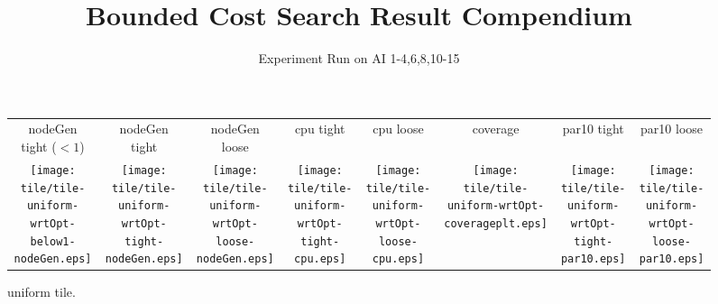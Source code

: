 \documentclass[a4paper,landscape]{article}
\title{Bounded Cost Search Result Compendium}
\author{Experiment Run on AI 1-4,6,8,10-15}
\begin{document}
\maketitle
\newcommand{\cpufigureplotwidth}{0.1\textwidth}
\begin{figure}[t]
	\centering
	\begin{tabular}{c c c c c c c c}
        nodeGen tight ($<1$) & nodeGen tight & nodeGen loose & cpu
        tight & cpu loose & coverage & par10 tight & par10 loose\\
	   \begin{minipage}{\cpufigureplotwidth}
       \texttt{[image: tile/tile-uniform-wrtOpt-below1-nodeGen.eps]}
        \end{minipage}&
        \begin{minipage}{\cpufigureplotwidth}
        \texttt{[image: tile/tile-uniform-wrtOpt-tight-nodeGen.eps]}
        \end{minipage}&
        \begin{minipage}{\cpufigureplotwidth}
       \texttt{[image: tile/tile-uniform-wrtOpt-loose-nodeGen.eps]}
        \end{minipage}&
        \begin{minipage}{\cpufigureplotwidth}
        \texttt{[image: tile/tile-uniform-wrtOpt-tight-cpu.eps]}
        \end{minipage}&
        \begin{minipage}{\cpufigureplotwidth}
        \texttt{[image: tile/tile-uniform-wrtOpt-loose-cpu.eps]}
        \end{minipage}&
        \begin{minipage}{\cpufigureplotwidth}
        \texttt{[image: tile/tile-uniform-wrtOpt-coverageplt.eps]}
        \end{minipage}&
        \begin{minipage}{\cpufigureplotwidth}
        \texttt{[image: tile/tile-uniform-wrtOpt-tight-par10.eps]}
        \end{minipage}&
        \begin{minipage}{\cpufigureplotwidth}
        \texttt{[image: tile/tile-uniform-wrtOpt-loose-par10.eps]}
        \end{minipage}
	\end{tabular}
\caption{uniform tile.}
\label{fig:tile-uniform}
\end{figure}
\end{document}
